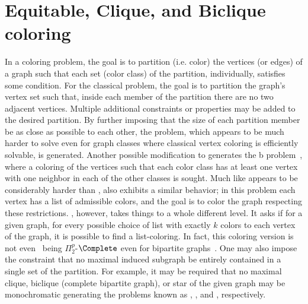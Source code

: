 \chapter{Equitable, Clique, and Biclique coloring}
\label{ch:coloring}

In a coloring problem, the goal is to partition (i.e. color) the vertices (or edges) of a graph such that each set (color class) of the partition, individually, satisfies some condition.
For the classical  problem, the goal is to partition the graph's vertex set such that, inside each member of the partition there are no two adjacent vertices.
Multiple additional constraints or properties may be added to the desired partition.
By further imposing that the size of each partition member be as close as possible to each other, the  problem, which appears to be much harder to solve even for graph classes where classical vertex coloring is efficiently solvable, is generated.
Another possible modification to  generates the b problem~\citep{b_coloring}, where a coloring of the vertices such that each color class has at least one vertex with one neighbor in each of the other classes is sought.
Much like  appears to be considerably harder than ,  also exhibits a similar behavior; in this problem each vertex has a list of admissible colors, and the goal is to color the graph respecting these restrictions.
, however, takes things to a whole different level.
It asks if for a given graph, for every possible choice of list with exactly $k$ colors to each vertex of the graph, it is possible to find a list-coloring.
In fact, this coloring version is not even \NPc\, being $\Pi_2^p$-$\Complete$ even for bipartite graphs~\citep{choosability_complexity}.
One may also impose the constraint that no maximal induced subgraph be entirely contained in a single set of the partition.
For example, it may be required that no maximal clique, biclique (complete bipartite graph), or star of the given graph may be monochromatic generating the problems known as ,  , and , respectively.

